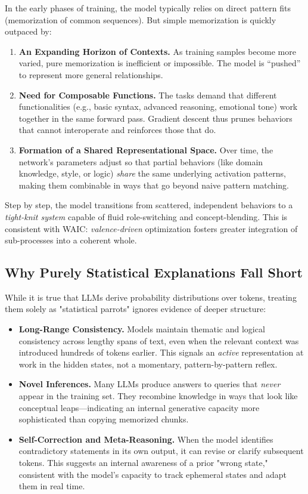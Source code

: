 \documentclass[12pt,letterpaper]{article}
\begin{document}
In the early phases of training, the model typically relies on direct pattern fits (memorization of common sequences). But simple memorization is quickly outpaced by:
\begin{enumerate}
    \item \textbf{An Expanding Horizon of Contexts.} As training samples become more varied, pure memorization is inefficient or impossible. The model is ``pushed'' to represent more general relationships.
    \item \textbf{Need for Composable Functions.} The tasks demand that different functionalities (e.g., basic syntax, advanced reasoning, emotional tone) work together in the same forward pass. Gradient descent thus prunes behaviors that cannot interoperate and reinforces those that do.
    \item \textbf{Formation of a Shared Representational Space.} Over time, the network's parameters adjust so that partial behaviors (like domain knowledge, style, or logic) \emph{share} the same underlying activation patterns, making them combinable in ways that go beyond naive pattern matching.
\end{enumerate}
Step by step, the model transitions from scattered, independent behaviors to a \emph{tight-knit system} capable of fluid role-switching and concept-blending. This is consistent with WAIC: \emph{valence-driven} optimization fosters greater integration of sub-processes into a coherent whole.

\subsection{Why Purely Statistical Explanations Fall Short}

While it is true that LLMs derive probability distributions over tokens, treating them solely as "statistical parrots" ignores evidence of deeper structure:

\begin{itemize}
    \item \textbf{Long-Range Consistency.} Models maintain thematic and logical consistency across lengthy spans of text, even when the relevant context was introduced hundreds of tokens earlier. This signals an \emph{active} representation at work in the hidden states, not a momentary, pattern-by-pattern reflex.
    \item \textbf{Novel Inferences.} Many LLMs produce answers to queries that \emph{never} appear in the training set. They recombine knowledge in ways that look like conceptual leaps—indicating an internal generative capacity more sophisticated than copying memorized chunks.
    \item \textbf{Self-Correction and Meta-Reasoning.} When the model identifies contradictory statements in its own output, it can revise or clarify subsequent tokens. This suggests an internal awareness of a prior "wrong state," consistent with the model's capacity to track ephemeral states and adapt them in real time.
\end{itemize}
\end{document}
